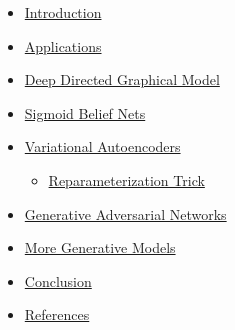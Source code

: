 \documentclass[11pt, a4paper, landscape]{article}
\begin{document}
\TitlePage


\NewPage{}
\vfill
\begin{itemize}
  \item \hyperlink{sli:introduction}{Introduction}
  \item \hyperlink{sli:applications}{Applications}
  \item \hyperlink{sli:graphicalmodel}{Deep Directed Graphical Model}
  \item \hyperlink{sli:sbn}{Sigmoid Belief Nets}
  \item \hyperlink{sli:vae}{Variational Autoencoders}
  \begin{itemize}
    \item \hyperlink{sli:reptrick}{Reparameterization Trick}
  \end{itemize}
  \item \hyperlink{sli:gan}{Generative Adversarial Networks}
  \item \hyperlink{sli:more}{More Generative Models}
  \item \hyperlink{sli:conclusion}{Conclusion}
  \item \hyperlink{sli:references}{References}
\end{itemize}
\vfill




\end{document}
